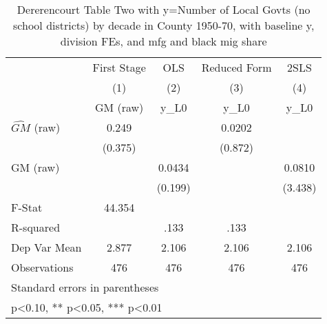 \begin{table}[htbp]\centering
\def\sym#1{\ifmmode^{#1}\else\(^{#1}\)\fi}
\caption{Dererencourt Table Two with y=Number of Local Govts (no school districts) by decade in County 1950-70, with baseline y, division FEs, and mfg and black mig share}
\begin{tabular}{l*{4}{c}}
\toprule
                    & First Stage   &         OLS   &Reduced Form   &        2SLS   \\
                    &\multicolumn{1}{c}{(1)}&\multicolumn{1}{c}{(2)}&\multicolumn{1}{c}{(3)}&\multicolumn{1}{c}{(4)}\\
                    &\multicolumn{1}{c}{GM  (raw)}&\multicolumn{1}{c}{y\_L0}&\multicolumn{1}{c}{y\_L0}&\multicolumn{1}{c}{y\_L0}\\
\midrule
$\hat{GM}$ (raw)    &       0.249   &               &      0.0202   &               \\
                    &     (0.375)   &               &     (0.872)   &               \\
\addlinespace
GM  (raw)           &               &      0.0434   &               &      0.0810   \\
                    &               &     (0.199)   &               &     (3.438)   \\
\midrule
F-Stat              &      44.354   &               &               &               \\
R-squared           &               &        .133   &        .133   &               \\
Dep Var Mean        &       2.877   &       2.106   &       2.106   &       2.106   \\
Observations        &         476   &         476   &         476   &         476   \\
\bottomrule
\multicolumn{5}{l}{\footnotesize Standard errors in parentheses}\\
\multicolumn{5}{l}{\footnotesize * p<0.10, ** p<0.05, *** p<0.01}\\
\end{tabular}
\end{table}
